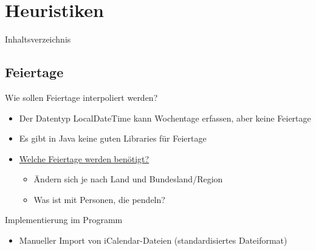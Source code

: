 \section{Heuristiken}
\begin{frame}{Inhaltsverzeichnis}
\tableofcontents[currentsection]
\end{frame}

\subsection{Feiertage}
\begin{frame}{\insertsubsectionhead}
\begin{block}{Wie sollen Feiertage interpoliert werden?}
\begin{itemize}
\item Der Datentyp LocalDateTime kann Wochentage erfassen, aber keine Feiertage
\item Es gibt in Java keine guten Libraries für Feiertage
\item \underline{Welche Feiertage werden benötigt?}
\begin{itemize}
\item Ändern sich je nach Land und Bundesland/Region
\item Was ist mit Personen, die pendeln?
\end{itemize}
\end{itemize}
\end{block}
\begin{block}{Implementierung im Programm}
\begin{itemize}
\item Manueller Import von iCalendar-Dateien (standardisiertes Dateiformat)
\end{itemize}
\end{block}
\end{frame}

